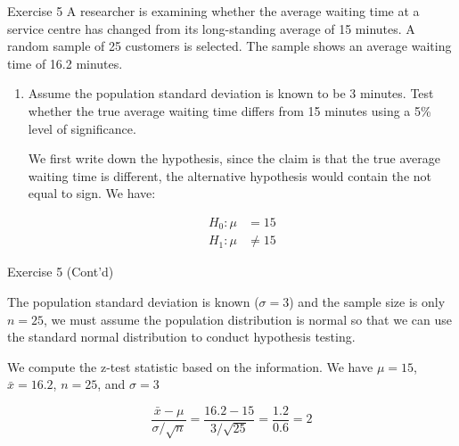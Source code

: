 \documentclass[
  ignorenonframetext,
  aspectratio=43,
]{beamer}
\let\olditem\item
\renewcommand\item{\olditem\justifying}
\begin{document}
\begin{frame}{Exercise 5}
\protect\hypertarget{exercise-5}{}
A researcher is examining whether the average waiting time at a service
centre has changed from its long-standing average of 15 minutes. A
random sample of 25 customers is selected. The sample shows an average
waiting time of 16.2 minutes.

\pause

\begin{enumerate}
\item
  Assume the population standard deviation is known to be 3 minutes.
  Test whether the true average waiting time differs from 15 minutes
  using a 5\% level of significance.

  \pause

  We first write down the hypothesis, since the claim is that the true
  average waiting time is different, the alternative hypothesis would
  contain the not equal to sign. We have: \vspace{-5pt}

  \pause

  \[
   \begin{aligned}
   H_0:\mu & =15 \\ 
   H_1:\mu & \neq 15
   \end{aligned}
   \]
\end{enumerate}
\end{frame}

\begin{frame}{Exercise 5 (Cont'd)}
\protect\hypertarget{exercise-5-contd}{}
\pause

The population standard deviation is known (\(\sigma = 3\)) and the
sample size is only \(n=25\), we must assume the population distribution
is normal so that we can use the standard normal distribution to conduct
hypothesis testing.

\pause

We compute the z-test statistic based on the information. We have
\(\mu = 15\), \(\bar{x} = 16.2\), \(n = 25\), and \(\sigma = 3\)

\pause

\[
\frac{\bar{x}-\mu}{\sigma/\sqrt{n}}
=
\frac{16.2 - 15}{3/\sqrt{25}}
=
\frac{1.2}{0.6}
=
2
\]
\end{frame}
\end{document}
